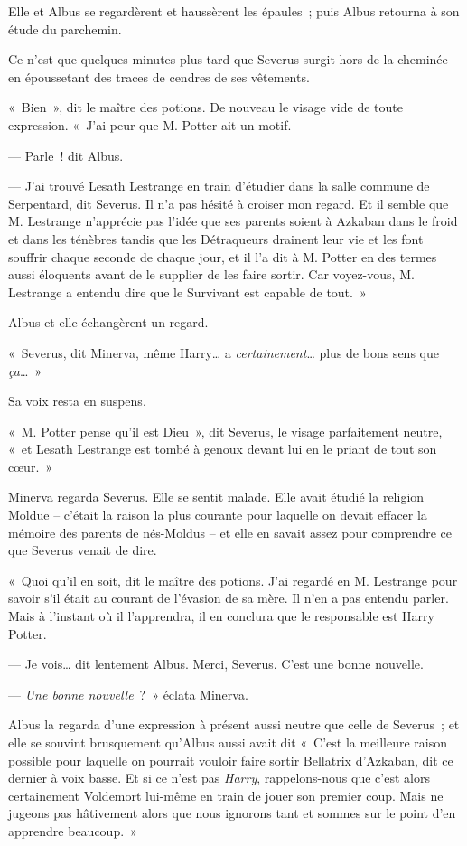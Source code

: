 Elle et Albus se regardèrent et haussèrent les épaules~; puis Albus retourna à son étude du parchemin.

Ce n'est que quelques minutes plus tard que Severus surgit hors de la cheminée en époussetant des traces de cendres de ses vêtements.

«~Bien~», dit le maître des potions. De nouveau le visage vide de toute expression. «~J'ai peur que M. Potter ait un motif.

--- Parle~! dit Albus.

--- J'ai trouvé Lesath Lestrange en train d'étudier dans la salle commune de Serpentard, dit Severus. Il n'a pas hésité à croiser mon regard. Et il semble que M. Lestrange n'apprécie pas l'idée que ses parents soient à Azkaban dans le froid et dans les ténèbres tandis que les Détraqueurs drainent leur vie et les font souffrir chaque seconde de chaque jour, et il l'a dit à M. Potter en des termes aussi éloquents avant de le supplier de les faire sortir. Car voyez-vous, M. Lestrange a entendu dire que le Survivant est capable de tout.~»

Albus et elle échangèrent un regard.

«~Severus, dit Minerva, même Harry… a \emph{certainement}… plus de bons sens que \emph{ça}…~»

Sa voix resta en suspens.

«~M. Potter pense qu'il est Dieu~», dit Severus, le visage parfaitement neutre, «~et Lesath Lestrange est tombé à genoux devant lui en le priant de tout son cœur.~»

Minerva regarda Severus. Elle se sentit malade. Elle avait étudié la religion Moldue -- c'était la raison la plus courante pour laquelle on devait effacer la mémoire des parents de nés-Moldus -- et elle en savait assez pour comprendre ce que Severus venait de dire.

«~Quoi qu'il en soit, dit le maître des potions. J'ai regardé en M. Lestrange pour savoir s'il était au courant de l'évasion de sa mère. Il n'en a pas entendu parler. Mais à l'instant où il l'apprendra, il en conclura que le responsable est Harry Potter.

--- Je vois… dit lentement Albus. Merci, Severus. C'est une bonne nouvelle.

--- \emph{Une bonne nouvelle}~?~» éclata Minerva.

Albus la regarda d'une expression à présent aussi neutre que celle de Severus~; et elle se souvint brusquement qu'Albus aussi avait dit «~C'est la meilleure raison possible pour laquelle on pourrait vouloir faire sortir Bellatrix d'Azkaban, dit ce dernier à voix basse. Et si ce n'est pas \emph{Harry}, rappelons-nous que c'est alors certainement Voldemort lui-même en train de jouer son premier coup. Mais ne jugeons pas hâtivement alors que nous ignorons tant et sommes sur le point d'en apprendre beaucoup.~»


